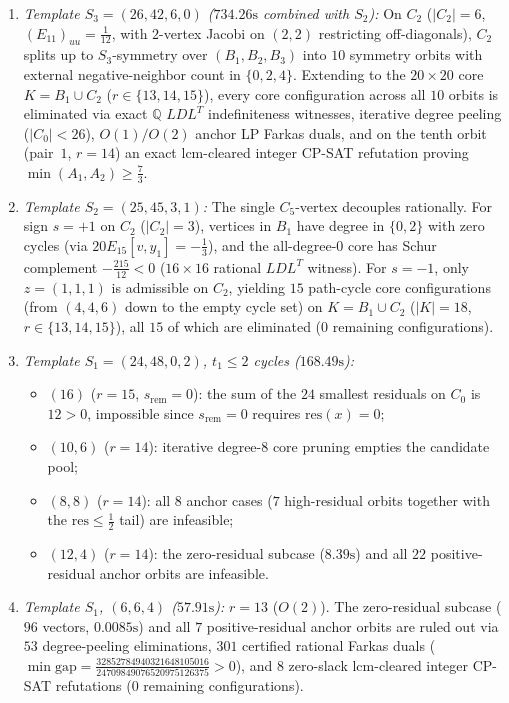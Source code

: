 \documentclass[11pt,reqno]{amsart}
\theoremstyle{definition}
\theoremstyle{remark}
\numberwithin{equation}{section}
\numberwithin{table}{section}
\begin{document}
\begin{enumerate}
  \item \emph{Template $S_3 = (26, 42, 6, 0)$ ($734.26\text{s}$ combined with $S_2$):} On $C_2$ ($|C_2| = 6$, $(E_{11})_{uu} = \frac{1}{12}$, with $2$-vertex Jacobi on $(2,2)$ restricting off-diagonals), $C_2$ splits up to $S_3$-symmetry over $(B_1, B_2, B_3)$ into $10$ symmetry orbits with external negative-neighbor count in $\{0, 2, 4\}$. Extending to the $20 \times 20$ core $K = B_1 \cup C_2$ ($r \in \{13, 14, 15\}$), every core configuration across all $10$ orbits is eliminated via exact $\mathbb{Q}$ $LDL^T$ indefiniteness witnesses, iterative degree peeling ($|C_0| < 26$), $O(1)/O(2)$ anchor LP Farkas duals, and on the tenth orbit (pair~$1$, $r = 14$) an exact $\mathrm{lcm}$-cleared integer CP-SAT refutation proving $\min(A_1, A_2) \ge \frac{7}{3}$.
  \item \emph{Template $S_2 = (25, 45, 3, 1)$:} The single $C_5$-vertex decouples rationally. For sign $s = +1$ on $C_2$ ($|C_2| = 3$), vertices in $B_1$ have degree in $\{0, 2\}$ with zero cycles (via $20E_{15}[v, y_1] = -\frac{1}{3}$), and the all-degree-$0$ core has Schur complement $-\frac{215}{12} < 0$ ($16 \times 16$ rational $LDL^T$ witness). For $s = -1$, only $z = (1, 1, 1)$ is admissible on $C_2$, yielding $15$ path-cycle core configurations (from $(4,4,6)$ down to the empty cycle set) on $K = B_1 \cup C_2$ ($|K| = 18$, $r \in \{13, 14, 15\}$), all $15$ of which are eliminated ($0$ remaining configurations).
  \item \emph{Template $S_1 = (24, 48, 0, 2)$, $t_1 \le 2$ cycles ($168.49\text{s}$):}
  \begin{itemize}
    \item $(16)$ ($r = 15$, $s_{\mathrm{rem}} = 0$): the sum of the $24$ smallest residuals on $C_0$ is $12 > 0$, impossible since $s_{\mathrm{rem}} = 0$ requires $\mathrm{res}(x) = 0$;
    \item $(10, 6)$ ($r = 14$): iterative degree-$8$ core pruning empties the candidate pool;
    \item $(8, 8)$ ($r = 14$): all $8$ anchor cases ($7$ high-residual orbits together with the $\mathrm{res} \le \frac{1}{2}$ tail) are infeasible;
    \item $(12, 4)$ ($r = 14$): the zero-residual subcase ($8.39\text{s}$) and all $22$ positive-residual anchor orbits are infeasible.
  \end{itemize}
  \item \emph{Template $S_1$, $(6, 6, 4)$ ($57.91\text{s}$):} $r = 13$ ($O(2)$). The zero-residual subcase ($96$ vectors, $0.0085\text{s}$) and all $7$ positive-residual anchor orbits are ruled out via $53$ degree-peeling eliminations, $301$ certified rational Farkas duals ($\min\text{gap} = \frac{32852784940321648105016}{24709849076520975126375} > 0$), and $8$ zero-slack $\mathrm{lcm}$-cleared integer CP-SAT refutations ($0$ remaining configurations).

\end{enumerate}
\end{document}
